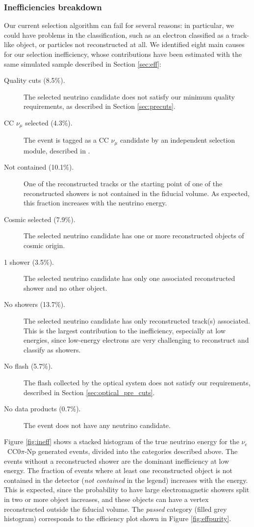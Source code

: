 \subsubsection{Inefficiencies breakdown}\label{sec:ineff}
Our current selection algorithm can fail for several reasons: in particular, we could have problems in the classification, such as an electron classified as a track-like object, or particles not reconstructed at all. We identified eight main causes for our selection inefficiency, whose contributions have been estimated with the same simulated sample described in Section \ref{sec:eff}:
\begin{description}

\item[Quality cuts (8.5\%).] {The selected neutrino candidate does not satisfy our minimum quality requirements, as described in Section \ref{sec:precuts}.}
\item[CC $\nu_{\mu}$ selected (4.3\%).]  {The event is tagged as a CC $\nu_{\mu}$ candidate by an independent selection module, described in \cite{ubxsec}}. 
\item[Not contained (10.1\%).] {One of the reconstructed tracks or the starting point of one of the reconstructed showers is not contained in the fiducial volume. As expected, this fraction increases with the neutrino energy}.
\item[Cosmic selected (7.9\%).] {The selected neutrino candidate has one or more reconstructed objects of cosmic origin}.
\item[1 shower (3.5\%).] {The selected neutrino candidate has only one associated reconstructed shower and no other object}. 
\item[No showers (13.7\%).]  {The selected neutrino candidate has only reconstructed track(s) associated. This is the largest contribution to the inefficiency, especially at low energies, since low-energy electrons are very challenging to reconstruct and classify as showers.}
\item[No flash (5.7\%).]  {The flash collected by the optical system does not satisfy our requirements, described in Section \ref{sec:optical_pre_cuts}}.
\item[No data products (0.7\%).] {The event does not have any neutrino candidate}.
\end{description}

Figure \ref{fig:ineff} shows a stacked histogram of the true neutrino energy for the $\nu_e$~CC0$\pi$-Np generated events, divided into the categories described above. The events without a reconstructed shower are the dominant inefficiency at low energy. The fraction of events where at least one reconstructed object is not contained in the detector (\emph{not contained} in the legend) increases with the energy. This is expected, since the probability to have large electromagnetic showers split in two or more object increases, and these objects can have a vertex reconstructed outside the fiducial volume. The \emph{passed} category (filled grey histogram) corresponds to the efficiency plot shown in Figure \ref{fig:effpurity}.

